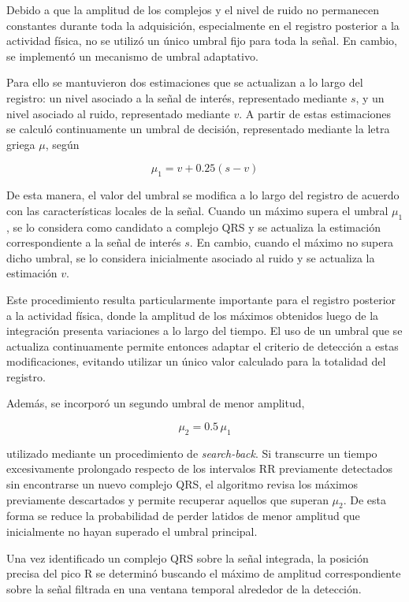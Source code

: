 \documentclass[12pt,a4paper]{article}
\begin{document}
Debido a que la amplitud de los complejos y el nivel de ruido no permanecen
constantes durante toda la adquisición, especialmente en el registro posterior
a la actividad física, no se utilizó un único umbral fijo para toda la señal.
En cambio, se implementó un mecanismo de umbral adaptativo.

Para ello se mantuvieron dos estimaciones que se actualizan a lo largo del
registro: un nivel asociado a la señal de interés, representado mediante $s$,
y un nivel asociado al ruido, representado mediante $v$. A partir de estas
estimaciones se calculó continuamente un umbral de decisión, representado
mediante la letra griega $\mu$, según

\[
\mu_1 = v + 0.25\left(s-v\right)
\]

De esta manera, el valor del umbral se modifica a lo largo del registro de
acuerdo con las características locales de la señal. Cuando un máximo supera
el umbral $\mu_1$, se lo considera como candidato a complejo QRS y se actualiza
la estimación correspondiente a la señal de interés $s$. En cambio, cuando el
máximo no supera dicho umbral, se lo considera inicialmente asociado al ruido
y se actualiza la estimación $v$.

Este procedimiento resulta particularmente importante para el registro
posterior a la actividad física, donde la amplitud de los máximos obtenidos
luego de la integración presenta variaciones a lo largo del tiempo. El uso de
un umbral que se actualiza continuamente permite entonces adaptar el criterio
de detección a estas modificaciones, evitando utilizar un único valor calculado
para la totalidad del registro.

Además, se incorporó un segundo umbral de menor amplitud,

\[
\mu_2 = 0.5\,\mu_1
\]

utilizado mediante un procedimiento de \textit{search-back}. Si transcurre un
tiempo excesivamente prolongado respecto de los intervalos RR previamente
detectados sin encontrarse un nuevo complejo QRS, el algoritmo revisa los
máximos previamente descartados y permite recuperar aquellos que superan
$\mu_2$. De esta forma se reduce la probabilidad de perder latidos de menor
amplitud que inicialmente no hayan superado el umbral principal.

Una vez identificado un complejo QRS sobre la señal integrada, la posición
precisa del pico R se determinó buscando el máximo de amplitud correspondiente
sobre la señal filtrada en una ventana temporal alrededor de la detección.
\end{document}
